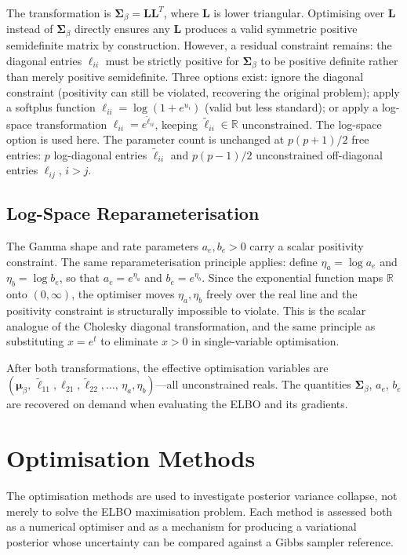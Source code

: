 \documentclass[11pt,a4paper]{article}
\newcommand{\R}{\mathbb{R}}
\begin{document}
The transformation is $\bm{\Sigma}_\beta = \bm{L}\bm{L}^T$, where $\bm{L}$ is lower triangular. Optimising over $\bm{L}$ instead of $\bm{\Sigma}_\beta$ directly ensures any $\bm{L}$ produces a valid symmetric positive semidefinite matrix by construction. However, a residual constraint remains: the diagonal entries $\ell_{ii}$ must be strictly positive for $\bm{\Sigma}_\beta$ to be positive definite rather than merely positive semidefinite. Three options exist: ignore the diagonal constraint (positivity can still be violated, recovering the original problem); apply a softplus function $\ell_{ii} = \log(1 + e^{u_i})$ (valid but less standard); or apply a log-space transformation $\ell_{ii} = e^{\tilde{\ell}_{ii}}$, keeping $\tilde{\ell}_{ii} \in \R$ unconstrained. The log-space option is used here. The parameter count is unchanged at $p(p+1)/2$ free entries: $p$ log-diagonal entries $\tilde{\ell}_{ii}$ and $p(p-1)/2$ unconstrained off-diagonal entries $\ell_{ij}$, $i > j$.

\subsection*{Log-Space Reparameterisation}

The Gamma shape and rate parameters $a_e, b_e > 0$ carry a scalar positivity constraint. The same reparameterisation principle applies: define $\eta_a = \log a_e$ and $\eta_b = \log b_e$, so that $a_e = e^{\eta_a}$ and $b_e = e^{\eta_b}$. Since the exponential function maps $\R$ onto $(0, \infty)$, the optimiser moves $\eta_a, \eta_b$ freely over the real line and the positivity constraint is structurally impossible to violate. This is the scalar analogue of the Cholesky diagonal transformation, and the same principle as substituting $x = e^t$ to eliminate $x > 0$ in single-variable optimisation.

After both transformations, the effective optimisation variables are $(\bm{\mu}_\beta,\, \tilde{\ell}_{11}, \ell_{21}, \tilde{\ell}_{22}, \ldots,\, \eta_a, \eta_b)$---all unconstrained reals. The quantities $\bm{\Sigma}_\beta$, $a_e$, $b_e$ are recovered on demand when evaluating the ELBO and its gradients.


\section{Optimisation Methods}

The optimisation methods are used to investigate posterior variance collapse, not merely to solve the ELBO maximisation problem. Each method is assessed both as a numerical optimiser and as a mechanism for producing a variational posterior whose uncertainty can be compared against a Gibbs sampler reference.
\end{document}

